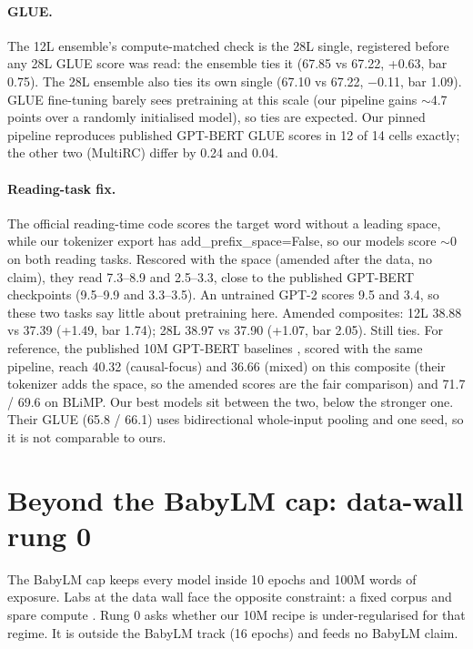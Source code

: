 \documentclass[11pt]{article}
\begin{document}
\paragraph{GLUE.} The 12L ensemble's compute-matched check is the 28L single, registered before any 28L GLUE score was
read: the ensemble ties it (67.85 vs 67.22, +0.63, bar 0.75). The 28L ensemble also ties its own single
(67.10 vs 67.22, $-$0.11, bar 1.09). GLUE fine-tuning barely sees pretraining at this scale (our pipeline gains
$\sim$4.7 points over a randomly initialised model), so ties are expected. Our pinned pipeline reproduces published
GPT-BERT \citep{charpentier2024gptbert} GLUE scores in 12 of 14 cells exactly; the other two (MultiRC) differ by 0.24
and 0.04.

\paragraph{Reading-task fix.} The official reading-time code scores the target word without a leading space, while our
tokenizer export has add\_prefix\_space=False, so our models score $\sim$0 on both reading tasks. Rescored with the space
(amended after the data, no claim), they read 7.3--8.9 and 2.5--3.3, close to the published GPT-BERT checkpoints
(9.5--9.9 and 3.3--3.5). An untrained GPT-2 scores 9.5 and 3.4, so these two tasks say little about pretraining here.
Amended composites: 12L 38.88 vs 37.39 (+1.49, bar 1.74); 28L 38.97 vs 37.90 (+1.07, bar
2.05). Still ties. For reference, the published 10M GPT-BERT baselines \citep{charpentier2024gptbert,babylm2025}, scored with the
same pipeline, reach 40.32 (causal-focus) and 36.66 (mixed) on this composite (their tokenizer adds the space, so the
amended scores are the fair comparison) and 71.7 / 69.6 on BLiMP. Our best models sit between the two, below the
stronger one. Their GLUE (65.8 / 66.1) uses bidirectional whole-input pooling and one seed, so it is not comparable to ours.

\section{Beyond the BabyLM cap: data-wall rung 0}
\label{sec:rung0}
The BabyLM cap keeps every model inside 10 epochs and 100M words of exposure. Labs at the data
wall face the opposite constraint: a fixed corpus and spare compute \citep{muennighoff2023scaling,kim2025infinite}.
Rung 0 asks whether our 10M recipe is under-regularised for that regime. It is outside the BabyLM track (16 epochs) and
feeds no BabyLM claim.
\end{document}
